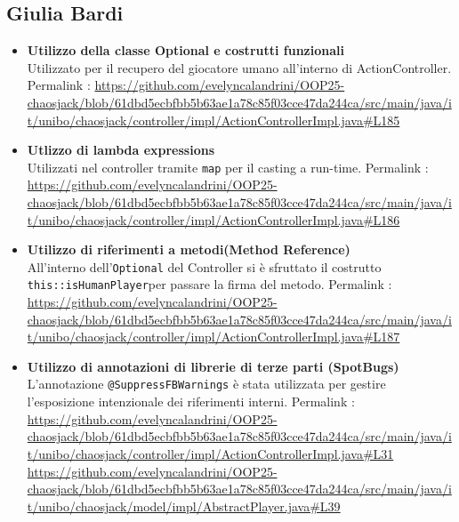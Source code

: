 \documentclass[a4paper,12pt]{report}
\begin{document}
\subsection*{Giulia Bardi}
\begin{itemize}
    \item \textbf{Utilizzo della classe Optional e costrutti funzionali}\\
    Utilizzato per il recupero del giocatore umano all'interno di ActionController.
    Permalink : \url{https://github.com/evelyncalandrini/OOP25-chaosjack/blob/61dbd5ecbfbb5b63ae1a78c85f03cce47da244ca/src/main/java/it/unibo/chaosjack/controller/impl/ActionControllerImpl.java#L185}
	\item \textbf{Utlizzo di lambda expressions}\\
	Utilizzati nel controller tramite \texttt{map} per il casting a run-time.
	Permalink : \url{https://github.com/evelyncalandrini/OOP25-chaosjack/blob/61dbd5ecbfbb5b63ae1a78c85f03cce47da244ca/src/main/java/it/unibo/chaosjack/controller/impl/ActionControllerImpl.java#L186}
	\item \textbf{Utilizzo di riferimenti a metodi(Method Reference)}\\
	All'interno dell'\texttt{Optional} del Controller si è sfruttato il costrutto \texttt{this::isHumanPlayer}per passare la firma del metodo.
	Permalink : \url{https://github.com/evelyncalandrini/OOP25-chaosjack/blob/61dbd5ecbfbb5b63ae1a78c85f03cce47da244ca/src/main/java/it/unibo/chaosjack/controller/impl/ActionControllerImpl.java#L187}
	\item \textbf{Utilizzo di annotazioni di librerie di terze parti (SpotBugs)}\\
	L'annotazione \texttt{@SuppressFBWarnings} è stata utilizzata per gestire l'esposizione intenzionale dei riferimenti interni.
	Permalink : \url{https://github.com/evelyncalandrini/OOP25-chaosjack/blob/61dbd5ecbfbb5b63ae1a78c85f03cce47da244ca/src/main/java/it/unibo/chaosjack/controller/impl/ActionControllerImpl.java#L31}
                 \url{https://github.com/evelyncalandrini/OOP25-chaosjack/blob/61dbd5ecbfbb5b63ae1a78c85f03cce47da244ca/src/main/java/it/unibo/chaosjack/model/impl/AbstractPlayer.java#L39}
\end{itemize}
\end{document}
